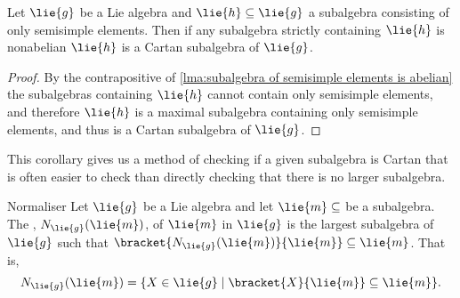 \documentclass[fleqn]{NotesClass}
\begin{document}
    \begin{crl}{}{}
        Let \(\lie{g}\) be a Lie algebra and \(\lie{h} \subseteq \lie{g}\) a subalgebra consisting of only semisimple elements.
        Then if any subalgebra strictly containing \(\lie{h}\) is nonabelian \(\lie{h}\) is a Cartan subalgebra of \(\lie{g}\).
        \begin{proof}
            By the contrapositive of \cref{lma:subalgebra of semisimple elements is abelian} the subalgebras containing \(\lie{h}\) cannot contain only semisimple elements, and therefore \(\lie{h}\) is a maximal subalgebra containing only semisimple elements, and thus is a Cartan subalgebra of \(\lie{g}\).
        \end{proof}
    \end{crl}
    
    This corollary gives us a method of checking if a given subalgebra is Cartan that is often easier to check than directly checking that there is no larger subalgebra.
    
    \begin{dfn}{Normaliser}{}
        Let \(\lie{g}\) be a Lie algebra and let \(\lie{m} \subseteq\) be a subalgebra.
        The , \(N_{\lie{g}}(\lie{m})\), of \(\lie{m}\) in \(\lie{g}\) is the largest subalgebra of \(\lie{g}\) such that \(\bracket{N_{\lie{g}}(\lie{m})}{\lie{m}} \subseteq \lie{m}\).
        That is,
        \begin{equation}
            N_{\lie{g}}(\lie{m}) = \{X \in \lie{g} \mid \bracket{X}{\lie{m}} \subseteq \lie{m}\}.
        \end{equation}
    \end{dfn}
    
\end{document}
